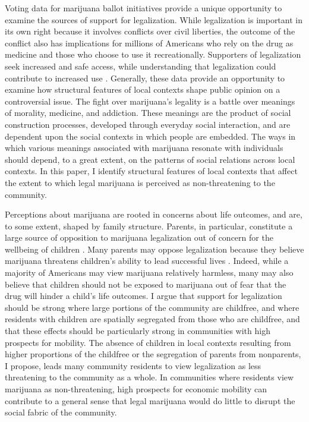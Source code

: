 Voting data for marijuana ballot initiatives provide a unique opportunity to examine the sources of support for legalization. While legalization is important in its own right because it involves conflicts over civil liberties, the outcome of the conflict also has implications for millions of Americans who rely on the drug as medicine and those who choose to use it recreationally. Supporters of legalization seek increased and safe access, while understanding that legalization could contribute to increased use \citep{ingraham_2017}. Generally, these data provide an opportunity to examine how structural features of local contexts shape public opinion on a controversial issue. The fight over marijuana's legality is a battle over meanings of morality, medicine, and addiction. These meanings are the product of social construction processes, developed through everyday social interaction, and are dependent upon the social contexts in which people are embedded. The ways in which various meanings associated with marijuana resonate with individuals should depend, to a great extent, on the patterns of social relations across local contexts. In this paper, I identify structural features of local contexts that affect the extent to which legal marijuana is perceived as non-threatening to the community. 




Perceptions about marijuana are rooted in concerns about life outcomes, and are, to some extent, shaped by family structure. Parents, in particular, constitute a large source of opposition to marijuana legalization out of concern for the wellbeing of children \citep{elder_and_greene_2019,newhart_and_dolphin_2018,caulkins_et_al_2012,rosenthal_and_kubby_1996}. Many parents may oppose legalization because they believe marijuana threatens children's ability to lead successful lives \citep{lynskey_and_hall_2000,kandel_et_al_1986,lifrak_et_al_1997,fergusson_et_al_2002,kandel_2002}. Indeed, while a majority of Americans may view marijuana relatively harmless, many may also believe that children should not be exposed to marijuana out of fear that the drug will hinder a child's life outcomes. I argue that support for legalization should be strong where large portions of the community are childfree, and where residents with children are spatially segregated from those who are childfree, and that these effects should be particularly strong in communities with high prospects for mobility. The absence of children in local contexts resulting from higher proportions of the childfree or the segregation of parents from nonparents, I propose, leads many community residents to view legalization as less threatening to the community as a whole. In communities where residents view marijuana as non-threatening, high prospects for economic mobility can contribute to a general sense that legal marijuana would do little to disrupt the social fabric of the community. 



